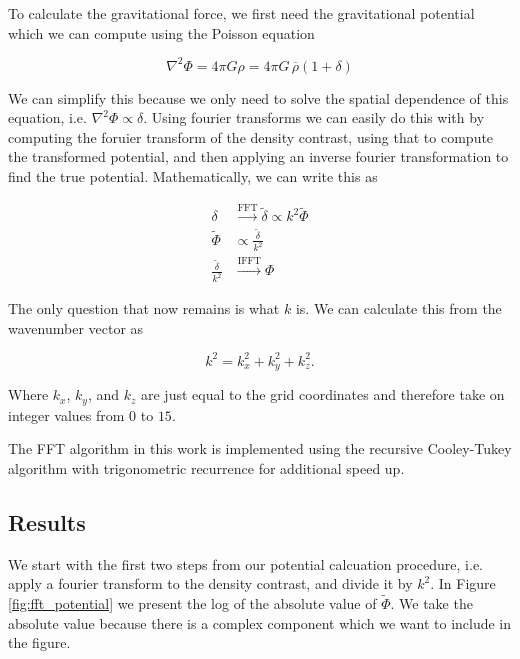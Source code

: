 To calculate the gravitational force, we first need the gravitational potential which we can compute using the Poisson equation

\begin{equation}
    \nabla^2 \Phi = 4\pi G\rho = 4\pi G\, \overline\rho(1 + \delta)
\end{equation}

We can simplify this because we only need to solve the spatial dependence of this equation, i.e. $\nabla^2\Phi \propto \delta$. Using fourier transforms we can easily do this with by computing the foruier transform of the density contrast, using that to compute the transformed potential, and then applying an inverse fourier transformation to find the true potential. Mathematically, we can write this as

\begin{align*}
    \delta & \xrightarrow{\mathrm{FFT}} \tilde{\delta} \propto k^2\tilde{\Phi} \\
    \tilde{\Phi} & \propto \frac{\tilde{\delta}}{k^2} \\
    \frac{\tilde{\delta}}{k^2} & \xrightarrow{\mathrm{IFFT}} \Phi
\end{align*}

The only question that now remains is what $k$ is. We can calculate this from the wavenumber vector as

\begin{equation}
    k^2 = k_x^2 + k_y^2 + k_z^2.
\end{equation}

Where $k_x$, $k_y$, and $k_z$ are just equal to the grid coordinates and therefore take on integer values from $0$ to $15$. 

The FFT algorithm in this work is implemented using the recursive Cooley-Tukey algorithm with trigonometric recurrence for additional speed up. 

\subsection{Results}

We start with the first two steps from our potential calcuation procedure, i.e. apply a fourier transform to the density contrast, and divide it by $k^2$. In Figure \ref{fig:fft_potential} we present the log of the absolute value of $\tilde\Phi$. We take the absolute value because there is a complex component which we want to include in the figure. 

